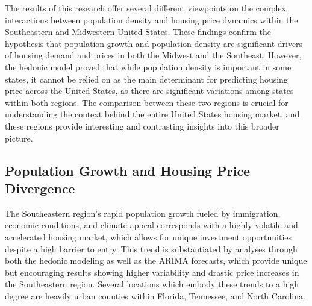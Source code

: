 \documentclass[journal,article,submit,pdftex,moreauthors]{Definitions/mdpi}
\begin{document}
The results of this research offer several different viewpoints on the complex interactions between population density and housing price dynamics within the Southeastern and Midwestern United States. These findings confirm the hypothesis that population growth and population density are significant drivers of housing demand and prices in both the Midwest and the Southeast. However, the hedonic model proved that while population density is important in some states, it cannot be relied on as the main determinant for predicting housing price across the United States, as there are significant variations among states within both regions. The comparison between these two regions is crucial for understanding the context behind the entire United States housing market, and these regions provide interesting and contrasting insights into this broader picture.

\subsection{Population Growth and Housing Price Divergence}

The Southeastern region’s rapid population growth fueled by immigration, economic conditions, and climate appeal corresponds with a highly volatile and accelerated housing market, which allows for unique investment opportunities despite a high barrier to entry.  This trend is substantiated by analyses through both the hedonic modeling as well as the ARIMA forecasts, which provide unique but encouraging results showing higher variability and drastic price increases in the Southeastern region. Several locations which embody these trends to a high degree are heavily urban counties within Florida, Tennessee, and North Carolina.
\end{document}

